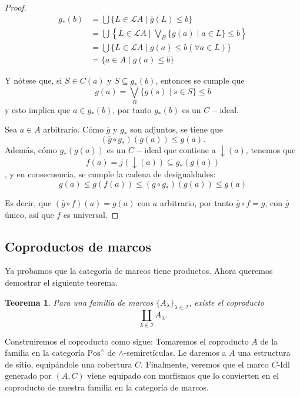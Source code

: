 \documentclass[12pt,letterpaper,titlepage]{article}
\newtheorem{thm}{Teorema}
\theoremstyle{definition}
\newcommand\down{{\downarrow}}
\renewcommand\inf{\wedge}
\newcommand\scr[1]{\mathscr{#1}}
\newcommand\<{\langle}
\renewcommand\>{\rangle}
\newcommand\Idl{\text{-}\mathrm{Idl}}
\newcommand{\Pos}{\mathrm{Pos}}
\begin{document}
\begin{proof}
    \begin{align*}
        g_*(b) & = \bigcup\{L\in\mathcal{L}A\mid\overline{g}(L)\leq b\} \\
               & = \bigcup\left\{L\in\mathcal{L}A\mid \bigvee_B\{g(a)\mid a\in L\}\leq b\right\} \\
               & = \bigcup\{L\in\mathcal{L}A\mid g(a)\leq b (\forall a \in L)\} \\
               & = \{a\in A\mid g(a)\leq b\} 
    \end{align*}

    Y nótese que, si $S\in C(a)$ y $S\subseteq g_*(b)$, entonces se cumple que
    \begin{equation*}
        g(a)= \bigvee_B\{g(s)\mid s\in S\}\leq b
    \end{equation*}
    y esto implica que $a\in g_*(b)$, por tanto $g_*(b)$ es un $C-$ideal. 

    Sea $a\in A$ arbitrario. Cómo $\overline{g}$ y $g_*$ son adjuntos, se tiene que
    \begin{equation*}
        (\overline{g}\circ g_*)(g(a))\leq g(a).
    \end{equation*}
    Además, cómo $g_*(g(a))$ es un $C-$ideal que contiene a $\down(a)$, tenemos que $$f(a)=j(\down(a))\subseteq g_*(g(a))$$, y en consecuencia, se cumple la cadena de desigualdades:
    \begin{equation*}
        g(a)\leq\overline{g}(f(a))\leq(\overline{g}\circ g_*)(g(a))\leq g(a)
    \end{equation*}

    Es decir, que $(\overline{g}\circ f)(a)=g(a)$
    con $a$ arbitrario,
    por tanto $\overline{g}\circ f = g$,
    con $\overline{g}$ único, así que $f$ es universal.
\end{proof}

\subsection{Coproductos de marcos}

Ya probamos que la categoría de marcos tiene productos.
Ahora queremos demostrar el siguiente teorema.

\begin{thm}
Para una familia de marcos $\{A_\lambda\}_{\lambda\in\scr I}$,
existe el coproducto
\[\coprod_{\lambda\in\scr I} A_\lambda.\]
\end{thm}

Construiremos el coproducto como sigue:
Tomaremos el coproducto $A$ de la familia
en la categoría $\Pos^\inf$ de $\inf$-semiretículas.
Le daremos a $A$ una estructura de sitio, equipándole una
cobertura $C$.
Finalmente, veremos que el marco $C\Idl$ generado por $(A,C)$
viene equipado con morfismos que lo convierten en el coproducto
de nuestra familia en la categoría de marcos.
\end{document}
